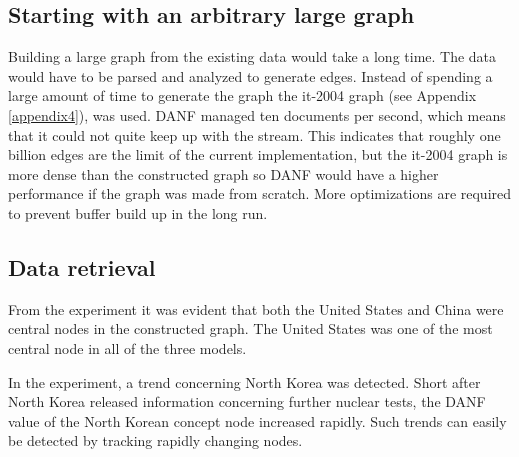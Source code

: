 \subsection{Starting with an arbitrary large graph}

Building a large graph from the existing data would take a long time. The data would have to be parsed and analyzed to generate edges. Instead of spending a large amount of time to generate the graph the it-2004 graph (see Appendix \ref{appendix4}), was used. DANF managed ten documents per second, which means that it could not quite keep up with the stream. This indicates that roughly one billion edges are the limit of the current implementation, but the it-2004 graph is more dense than the constructed graph so DANF would have a higher performance if the graph was made from scratch. More optimizations are required to prevent buffer build up in the long run. 

\subsection{Data retrieval}
From the experiment it was evident that both the United States and China were central nodes in the constructed graph. The United States was one of the most central node in all of the three models.

In the experiment, a trend concerning North Korea was detected. Short after North Korea released information concerning further nuclear tests, the DANF value of the North Korean concept node increased rapidly. Such trends can easily be detected by tracking rapidly changing nodes.
